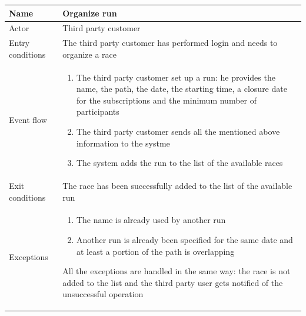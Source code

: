 \begin{table}[H]
\begin{tabularx}{\textwidth}{|l|X|}
\hline
 Name & Organize run \\ \hline
 Actor & Third party customer \\ \hline
 Entry conditions & The third party customer has performed login and needs to organize a race\\ \hline
 Event flow & 
 \begin{enumerate}
 	\item The third party customer set up a run: he provides the name, the path, the date, the starting time, a closure date for the subscriptions and the minimum number of participants
  	\item The third party customer sends all the mentioned above information to the systme
 	\item The system adds the run to the list of the available races
 \end{enumerate}   \\ \hline
 Exit conditions & The race has been successfully added to the list of the available run \\ \hline
 Exceptions & 
 \begin{enumerate}
 	\item The name is already used by another run
 	\item Another run is already been specified for the same date and at least a portion of the path is overlapping 
 \end{enumerate}  
 All the exceptions are handled in the same way: the race is not added to the list and the third party user gets notified of the unsuccessful operation 
 \\ \hline
\end{tabularx}
\end{table}


